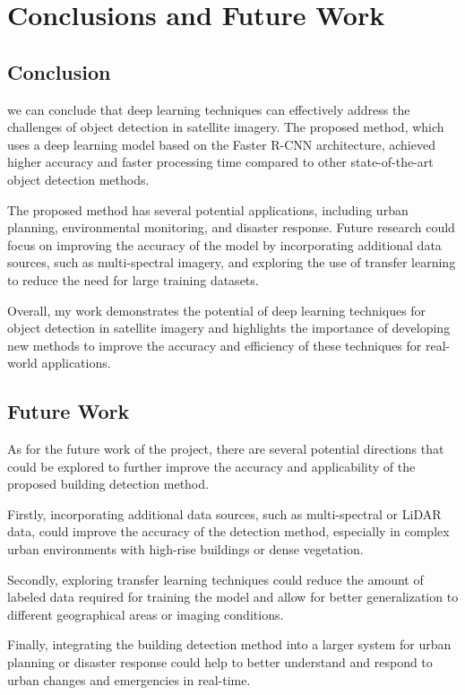 \chapter{Conclusions and Future Work}
\section{Conclusion}
we can conclude that deep learning techniques can effectively address the challenges of object detection in satellite imagery. The proposed method, which uses a deep learning model based on the Faster R-CNN architecture, achieved higher accuracy and faster processing time compared to other state-of-the-art object detection methods.

The proposed method has several potential applications, including urban planning, environmental monitoring, and disaster response. Future research could focus on improving the accuracy of the model by incorporating additional data sources, such as multi-spectral imagery, and exploring the use of transfer learning to reduce the need for large training datasets.

Overall, my work demonstrates the potential of deep learning techniques for object detection in satellite imagery and highlights the importance of developing new methods to improve the accuracy and efficiency of these techniques for real-world applications.

\section{Future Work}
As for the future work of the project, there are several potential directions that could be explored to further improve the accuracy and applicability of the proposed building detection method.

Firstly, incorporating additional data sources, such as multi-spectral or LiDAR data, could improve the accuracy of the detection method, especially in complex urban environments with high-rise buildings or dense vegetation.

Secondly, exploring transfer learning techniques could reduce the amount of labeled data required for training the model and allow for better generalization to different geographical areas or imaging conditions.

Finally, integrating the building detection method into a larger system for urban planning or disaster response could help to better understand and respond to urban changes and emergencies in real-time.